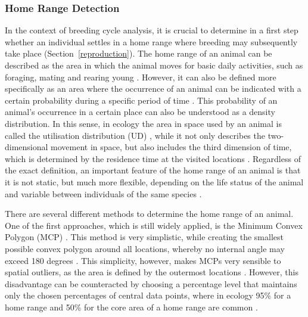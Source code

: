 \subsubsection{Home Range Detection}
In the context of breeding cycle analysis, it is crucial to determine in a first step whether an individual settles in a home range where breeding may subsequently take place (Section~\ref{reproduction}). The home range of an animal can be described as the area in which the animal moves for basic daily activities, such as foraging, mating and rearing young \parencite{burt1943territoriality}. However, it can also be defined more specifically as an area where the occurrence of an animal can be indicated with a certain probability during a specific period of time \parencite{kernohan2001analysis}. This probability of an animal's occurrence in a certain place can also be understood as a density distribution. In this sense, in ecology the area in space used by an animal is called the utilisation distribution (UD) \parencite{vanwinkle1975comparison}, while it not only describes the two-dimensional movement in space, but also includes the third dimension of time, which is determined by the residence time at the visited locations \parencite{seaman1999effects}. Regardless of the exact definition, an important feature of the home range of an animal is that it is not static, but much more flexible, depending on the life status of the animal and variable between individuals of the same species \parencite{halbrook2018estimated}.

There are several different methods to determine the home range of an animal. One of the first approaches, which is still widely applied, is the Minimum Convex Polygon (MCP) \parencite{laver2008critical}. This method is very simplistic, while creating the smallest possible convex polygon around all locations, whereby no internal angle may exceed 180 degrees \parencite{burgman2003bias}. This simplicity, however, makes MCPs very sensible to spatial outliers, as the area is defined by the outermost locations \parencite{burgman2003bias}. However, this disadvantage can be counteracted by choosing a percentage level that maintains only the chosen percentages of central data points, where in ecology 95\% for a home range and 50\% for the core area of a home range are common \parencite{hasselblad2007male, houston2011breeding, kernohan2001analysis}.

